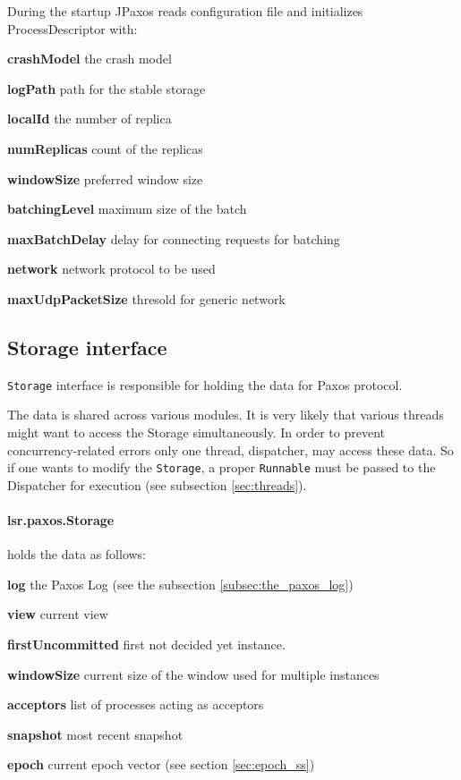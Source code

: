 During the startup JPaxos reads configuration file and initializes ProcessDescriptor with:
\begin{tightList}[\setlength{\labelwidth}{0em}]
 \item[\textbf{crashModel}] the crash model
 \item[\textbf{logPath}] path for the stable storage
 \item[\textbf{localId}] the number of replica
 \item[\textbf{numReplicas}] count of the replicas
 \item[\textbf{windowSize}] preferred window size
 \item[\textbf{batchingLevel}] maximum size of the batch
 \item[\textbf{maxBatchDelay}] delay for connecting requests for batching
 \item[\textbf{network}] network protocol to be used
 \item[\textbf{maxUdpPacketSize}] thresold for generic network
\end{tightList}

\subsection{Storage interface}
\label{subsec:storage_interface}

\texttt{Storage} interface is responsible for holding the data for Paxos
protocol.

The data is shared across various modules.
It is very likely that various threads might want to access the Storage simultaneously. In order to prevent concurrency-related errors only one thread, dispatcher, may access these data. So if one wants to modify the \texttt{Storage}, a proper \texttt{Runnable} must be passed to the Dispatcher for execution (see subsection \ref{sec:threads}).

\paragraph{\normalfont \ttfamily lsr.paxos.Storage}
holds the data as follows:
\begin{tightList}[\setlength{\labelwidth}{0em}]
  \item[\textbf{log}] the Paxos Log (see the subsection \ref{subsec:the_paxos_log})
  \item[\textbf{view}] current view
  \item[\textbf{firstUncommitted}] first not decided yet instance.
  \item[\textbf{windowSize}] current size of the window used for multiple instances
  \item[\textbf{acceptors}] list of processes acting as acceptors
  \item[\textbf{snapshot}] most recent snapshot
  \item[\textbf{epoch}] current epoch vector (see section \ref{sec:epoch_ss})%
\end{tightList}

